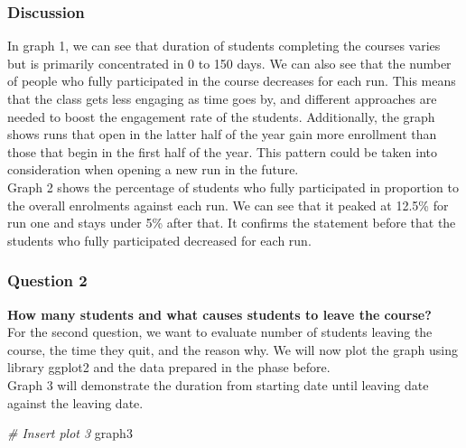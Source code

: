 \documentclass[12pt,]{article}
\newenvironment{Shaded}{\begin{snugshade}}{\end{snugshade}}
\newcommand{\CommentTok}[1]{\textcolor[rgb]{0.56,0.35,0.01}{\textit{#1}}}
\newcommand{\NormalTok}[1]{#1}
\begin{document}
\hypertarget{discussion}{%
\subsubsection{Discussion}\label{discussion}}

In graph 1, we can see that duration of students completing the courses
varies but is primarily concentrated in 0 to 150 days. We can also see
that the number of people who fully participated in the course decreases
for each run. This means that the class gets less engaging as time goes
by, and different approaches are needed to boost the engagement rate of
the students. Additionally, the graph shows runs that open in the latter
half of the year gain more enrollment than those that begin in the first
half of the year. This pattern could be taken into consideration when
opening a new run in the future.\\
\hfill\break Graph 2 shows the percentage of students who fully
participated in proportion to the overall enrolments against each run.
We can see that it peaked at 12.5\% for run one and stays under 5\%
after that. It confirms the statement before that the students who fully
participated decreased for each run.

\hypertarget{question-2-1}{%
\subsubsection{Question 2}\label{question-2-1}}

\textbf{How many students and what causes students to leave the
course?}\\
\hfill\break For the second question, we want to evaluate number of
students leaving the course, the time they quit, and the reason why. We
will now plot the graph using library ggplot2 and the data prepared in
the phase before.\\
\hfill\break Graph 3 will demonstrate the duration from starting date
until leaving date against the leaving date.

\begin{Shaded}
\begin{Highlighting}[]
\CommentTok{\# Insert plot 3}
\NormalTok{graph3}
\end{Highlighting}
\end{Shaded}
\end{document}
